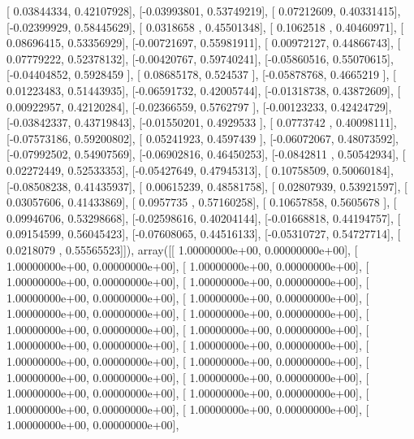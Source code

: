 \documentclass{article}
\begin{document}
       [ 0.03844334,  0.42107928],
       [-0.03993801,  0.53749219],
       [ 0.07212609,  0.40331415],
       [-0.02399929,  0.58445629],
       [ 0.0318658 ,  0.45501348],
       [ 0.1062518 ,  0.40460971],
       [ 0.08696415,  0.53356929],
       [-0.00721697,  0.55981911],
       [ 0.00972127,  0.44866743],
       [ 0.07779222,  0.52378132],
       [-0.00420767,  0.59740241],
       [-0.05860516,  0.55070615],
       [-0.04404852,  0.5928459 ],
       [ 0.08685178,  0.524537  ],
       [-0.05878768,  0.4665219 ],
       [ 0.01223483,  0.51443935],
       [-0.06591732,  0.42005744],
       [-0.01318738,  0.43872609],
       [ 0.00922957,  0.42120284],
       [-0.02366559,  0.5762797 ],
       [-0.00123233,  0.42424729],
       [-0.03842337,  0.43719843],
       [-0.01550201,  0.4929533 ],
       [ 0.0773742 ,  0.40098111],
       [-0.07573186,  0.59200802],
       [ 0.05241923,  0.4597439 ],
       [-0.06072067,  0.48073592],
       [-0.07992502,  0.54907569],
       [-0.06902816,  0.46450253],
       [-0.0842811 ,  0.50542934],
       [ 0.02272449,  0.52533353],
       [-0.05427649,  0.47945313],
       [ 0.10758509,  0.50060184],
       [-0.08508238,  0.41435937],
       [ 0.00615239,  0.48581758],
       [ 0.02807939,  0.53921597],
       [ 0.03057606,  0.41433869],
       [ 0.0957735 ,  0.57160258],
       [ 0.10657858,  0.5605678 ],
       [ 0.09946706,  0.53298668],
       [-0.02598616,  0.40204144],
       [-0.01668818,  0.44194757],
       [ 0.09154599,  0.56045423],
       [-0.07608065,  0.44516133],
       [-0.05310727,  0.54727714],
       [ 0.0218079 ,  0.55565523]]), array([[  1.00000000e+00,   0.00000000e+00],
       [  1.00000000e+00,   0.00000000e+00],
       [  1.00000000e+00,   0.00000000e+00],
       [  1.00000000e+00,   0.00000000e+00],
       [  1.00000000e+00,   0.00000000e+00],
       [  1.00000000e+00,   0.00000000e+00],
       [  1.00000000e+00,   0.00000000e+00],
       [  1.00000000e+00,   0.00000000e+00],
       [  1.00000000e+00,   0.00000000e+00],
       [  1.00000000e+00,   0.00000000e+00],
       [  1.00000000e+00,   0.00000000e+00],
       [  1.00000000e+00,   0.00000000e+00],
       [  1.00000000e+00,   0.00000000e+00],
       [  1.00000000e+00,   0.00000000e+00],
       [  1.00000000e+00,   0.00000000e+00],
       [  1.00000000e+00,   0.00000000e+00],
       [  1.00000000e+00,   0.00000000e+00],
       [  1.00000000e+00,   0.00000000e+00],
       [  1.00000000e+00,   0.00000000e+00],
       [  1.00000000e+00,   0.00000000e+00],
       [  1.00000000e+00,   0.00000000e+00],
       [  1.00000000e+00,   0.00000000e+00],
\end{document}

